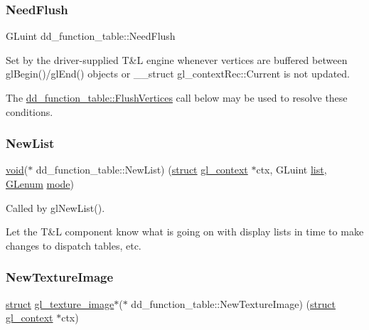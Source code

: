 \subsubsection{\texorpdfstring{Need\+Flush}{NeedFlush}}
{\footnotesize\ttfamily G\+Luint dd\+\_\+function\+\_\+table\+::\+Need\+Flush}

Set by the driver-\/supplied T\&L engine whenever vertices are buffered between gl\+Begin()/gl\+End() objects or \+\_\+\+\_\+struct gl\+\_\+context\+Rec\+::\+Current is not updated.

The \hyperlink{structdd__function__table_a3c743494ace4641ddbd61b3168fe7f96}{dd\+\_\+function\+\_\+table\+::\+Flush\+Vertices} call below may be used to resolve these conditions. \mbox{\label{structdd__function__table_a4fb10c66063fa5b3c6b98d4c9fc38b39}} 
\subsubsection{\texorpdfstring{New\+List}{NewList}}
{\footnotesize\ttfamily \hyperlink{interfacevoid}{void}($\ast$ dd\+\_\+function\+\_\+table\+::\+New\+List) (\hyperlink{interfacestruct}{struct} \hyperlink{structgl__context}{gl\+\_\+context} $\ast$ctx, G\+Luint \hyperlink{classlist}{list}, \hyperlink{interfacevoid}{G\+Lenum} \hyperlink{interfacevoid}{mode})}

Called by gl\+New\+List().

Let the T\&L component know what is going on with display lists in time to make changes to dispatch tables, etc. \mbox{\label{structdd__function__table_af908ae93c473fd237a2d9b98245d2006}} 
\subsubsection{\texorpdfstring{New\+Texture\+Image}{NewTextureImage}}
{\footnotesize\ttfamily \hyperlink{interfacestruct}{struct} \hyperlink{structgl__texture__image}{gl\+\_\+texture\+\_\+image}$\ast$($\ast$ dd\+\_\+function\+\_\+table\+::\+New\+Texture\+Image) (\hyperlink{interfacestruct}{struct} \hyperlink{structgl__context}{gl\+\_\+context} $\ast$ctx)}

